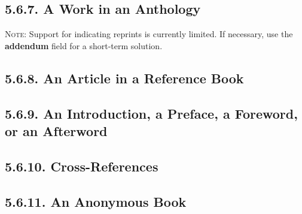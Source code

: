 \documentclass[12pt]{article}
\begin{document}
\printbibliography[heading=blank,segment=6]


\subsection*{5.6.7. A Work in an Anthology}
\newrefsegment
\textsc{Note:} Support for indicating reprints is currently limited. If necessary, use the \textbf{addendum} field for a short-term solution.

\nocite{allende92aa,franco98aa,hansberry71aa,hanzlik92aa,more97aa,witchcraft86aa,douglass00aa,franklin92aa}

\printbibliography[heading=blank,segment=7]


\subsection*{5.6.8. An Article in a Reference Book}
\newrefsegment
\nocite{azimuthal93aa,ginsburg02aa,mandarin94aa,mohanty87aa,noon89aa,allen95aa,le-patourel87aa}

\printbibliography[heading=blank,segment=8]


\subsection*{5.6.9. An Introduction, a Preface, a Foreword, or an Afterword}
\newrefsegment
\nocite{borges73aa,coetzee01aa,drabble85aa,hamill94aa,marsalis93aa,sears01aa,brodsky97aa,doody96aa,doctorow82aa}

\printbibliography[heading=blank,segment=9]


\subsection*{5.6.10. Cross-References}
\newrefsegment

\nocite{baker86aa}\nocite{baker93aa}\nocite{oates2000aa}\nocite{lennon86aa}\nocite{angelou86aa}\nocite{lebowitz93aa}\nocite{hurston93aa}\nocite{walker00aa}\nocite{rodriguez00aa}\nocite{kingston00aa}\nocite{agee00aa}\nocite{atwan00aa}

\printbibliography[heading=blank,segment=10]


\subsection*{5.6.11. An Anonymous Book}
\newrefsegment
\end{document}
